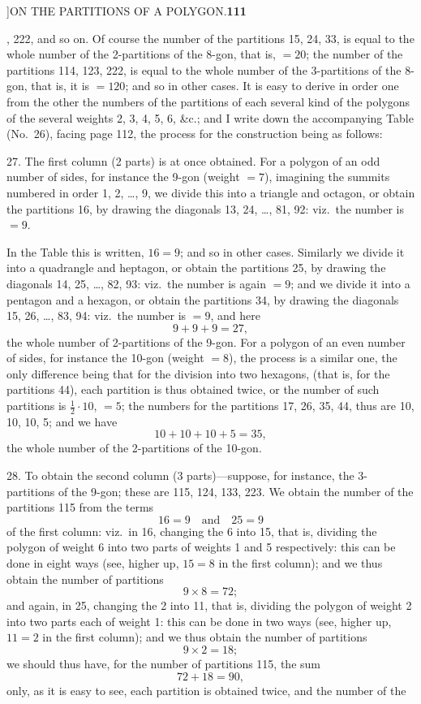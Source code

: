\documentclass[11pt]{article}
\begin{document}
\newpage
{}]\hfill ON THE PARTITIONS OF A POLYGON.\hfill\textbf{111}

, 222, and so on. Of course the number of the partitions 15, 24, 33, is
equal to the whole number of the 2-partitions of the 8-gon, that is, $=20$;
the number of the partitions 114, 123, 222, is equal to the whole number of
the 3-partitions of the 8-gon, that is, it is $=120$; and so in other cases.
It is easy to derive in order one from the other the numbers of the
partitions of each several kind of the polygons of the several weights 2, 3,
4, 5, 6, \&c.; and I write down the accompanying Table (No.~26), facing page
112, the process for the construction being as follows:

\hspace{1em} 27. The first column (2 parts) is at once obtained. For a
polygon of an odd number of sides, for instance the 9-gon (weight $=7$),
imagining the summits numbered in order 1, 2, \ldots, 9, we divide this into
a triangle and octagon, or obtain the partitions 16, by drawing the
diagonals 13, 24, \ldots, 81, 92: viz.\ the number is $=9$.

In the Table this is written, $16=9$; and so in other cases. Similarly we
divide it into a quadrangle and heptagon, or obtain the partitions 25, by
drawing the diagonals 14, 25, \ldots, 82, 93: viz.\ the number is again $=9$;
and we divide it into a pentagon and a hexagon, or obtain the partitions
34, by drawing the diagonals 15, 26, \ldots, 83, 94: viz.\ the number is
$=9$, and here
\[
9+9+9=27,
\]
the whole number of 2-partitions of the 9-gon. For a polygon of an even
number of sides, for instance the 10-gon (weight $=8$), the process is a
similar one, the only difference being that for the division into two
hexagons, (that is, for the partitions 44), each partition is thus obtained
twice, or the number of such partitions is $\tfrac{1}{2}\cdot 10$, $=5$; the
numbers for the partitions 17, 26, 35, 44, thus are 10, 10, 10, 5; and we
have
\[
10+10+10+5=35,
\]
the whole number of the 2-partitions of the 10-gon.

\hspace{1em} 28. To obtain the second column (3 parts)---suppose, for
instance, the 3-partitions of the 9-gon; these are 115, 124, 133, 223. We
obtain the number of the partitions 115 from the terms
\[
16=9\quad\text{and}\quad 25=9
\]
of the first column: viz.\ in 16, changing the 6 into 15, that is, dividing
the polygon of weight 6 into two parts of weights 1 and 5 respectively: this
can be done in eight ways (see, higher up, $15=8$ in the first column); and
we thus obtain the number of partitions
\[
9\times 8=72;
\]
and again, in 25, changing the 2 into 11, that is, dividing the polygon of
weight 2 into two parts each of weight 1: this can be done in two ways (see,
higher up, $11=2$ in the first column); and we thus obtain the number of
partitions
\[
9\times 2=18;
\]
we should thus have, for the number of partitions 115, the sum
\[
72+18=90,
\]
only, as it is easy to see, each partition is obtained twice, and the
number of the
\end{document}
